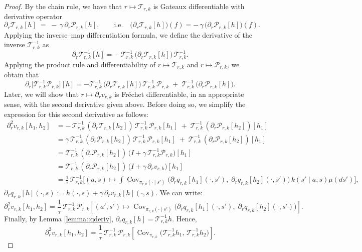 \documentclass[11pt]{article}
\theoremstyle{plain}
\begin{document}
\begin{proof}
By the chain rule, we have that \( r \mapsto \mathcal{T}_{r,k} \) is Gateaux differentiable with derivative operator
\[
\partial_r \mathcal{T}_{r,k}[h] \;=\; -\,\gamma\,\partial_r \mathcal{P}_{r,k}[h],
\qquad\text{i.e.}\quad
\big(\partial_r \mathcal{T}_{r,k}[h]\big)(f)
= -\,\gamma\,\big(\partial_r \mathcal{P}_{r,k}[h]\big)(f).
\]
Applying the inverse–map differentiation formula, we define the derivative of the inverse $\mathcal{T}_{r,k}^{-1}$ as
\[
\partial_r \mathcal{T}_{r,k}^{-1}[h]
= -\,\mathcal{T}_{r,k}^{-1}\,\big(\partial_r \mathcal{T}_{r,k}[h]\big)\,\mathcal{T}_{r,k}^{-1}.
\]
Applying the product rule and differentiability of
\(r\mapsto \mathcal{T}_{r,k}\) and \(r\mapsto \mathcal{P}_{r,k}\), we obtain that
\[
\partial_r\!\big[\mathcal{T}_{r,k}^{-1}\mathcal{P}_{r,k}\big][h]
= - \mathcal{T}_{r,k}^{-1}\,\big(\partial_r \mathcal{T}_{r,k}[h]\big)\,\mathcal{T}_{r,k}^{-1}\,\mathcal{P}_{r,k}
\;+\;
\mathcal{T}_{r,k}^{-1}\,\big(\partial_r \mathcal{P}_{r,k}[h]\big).
\]
Later, we will show that $r \mapsto \partial_r v_{r,k}$ is Fr\'echet differentiable, in an appropriate sense, with the second derivative given above. Before doing so, we simplify the expression for this second derivative as follows:
\begin{align*}
\partial_r^2 v_{r,k}[h_1,h_2]
&= -\,\mathcal{T}_{r,k}^{-1}\,(\partial_r \mathcal{T}_{r,k}[h_2])\,\mathcal{T}_{r,k}^{-1}\,\mathcal{P}_{r,k}[h_1]
\;+\;
\mathcal{T}_{r,k}^{-1}\,(\partial_r \mathcal{P}_{r,k}[h_2])[h_1] \\
&= \gamma\,\mathcal{T}_{r,k}^{-1}\,(\partial_r \mathcal{P}_{r,k}[h_2])\,\mathcal{T}_{r,k}^{-1}\,\mathcal{P}_{r,k}[h_1]
\;+\;
\mathcal{T}_{r,k}^{-1}\,(\partial_r \mathcal{P}_{r,k}[h_2])[h_1] \\
&= \mathcal{T}_{r,k}^{-1}\,(\partial_r \mathcal{P}_{r,k}[h_2])\,
\big(I+\gamma\,\mathcal{T}_{r,k}^{-1}\mathcal{P}_{r,k}\big)[h_1]\\
&= \mathcal{T}_{r,k}^{-1}\,(\partial_r \mathcal{P}_{r,k}[h_2])\,
\big(I+\gamma\,\partial_r v_{r,k}\big)[h_1]\\
&= \frac{1}{\tau}\,\mathcal{T}_{r,k}^{-1}\!\Big[(a,s)\mapsto 
\int \operatorname{Cov}_{\pi_{r,k}(\cdot\mid s')}\!\Big(
\partial_r q_{r,k}[h_1](\cdot,s'),\; \partial_r q_{r,k}[h_2](\cdot,s')
\Big)\,k(s'\mid a,s) \mu(ds')\Big],
\end{align*}
$\partial_r q_{r,k}[h](\cdot,s):=h(\cdot,s)+\gamma\,\partial_r v_{r,k}[h](\cdot,s).$
We can write:
\[
\partial_r^2 v_{r,k}[h_1,h_2]
= \frac{1}{\tau}\,\mathcal{T}_{r,k}^{-1}\,\mathcal{P}_{r,k}\!\left[(a',s')\mapsto 
\operatorname{Cov}_{\pi_{r,k}(\cdot\mid s')}\!\Big(
\partial_r q_{r,k}[h_1](\cdot,s'),\; \partial_r q_{r,k}[h_2](\cdot,s')
\Big)\right].
\]
Finally, by Lemma \ref{lemma::qderiv}, \(\partial_r q_{r,k}[h] = \mathcal{T}_{r,k}^{-1}h\). 
Hence,
\[
\partial_r^2 v_{r,k}[h_1,h_2]
= \frac{1}{\tau}\,\mathcal{T}_{r,k}^{-1}\,\mathcal{P}_{r,k}\!\left[
\operatorname{Cov}_{\pi_{r,k}}\!\Big(\mathcal{T}_{r,k}^{-1}h_1,\, \mathcal{T}_{r,k}^{-1}h_2
\Big)\right].
\]


\end{proof}
\end{document}
